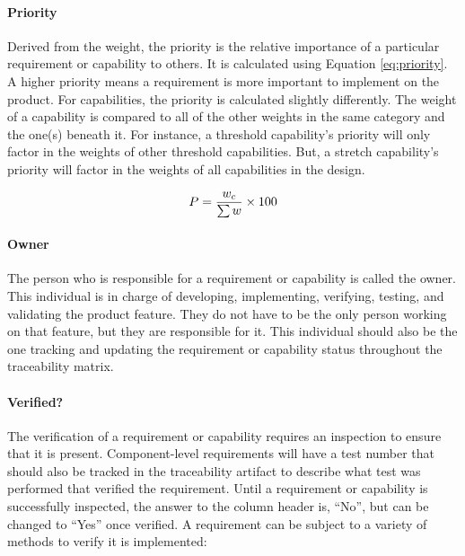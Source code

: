 \paragraph*{Priority} Derived from the weight, the priority is the relative importance of a particular requirement or capability to others.
It is calculated using Equation \ref{eq:priority}. 
A higher priority means a requirement is more important to implement on the product.
For capabilities, the priority is calculated slightly differently.
The weight of a capability is compared to all of the other weights in the same category and the one(s) beneath it.
For instance, a threshold capability's priority will only factor in the weights of other threshold capabilities.
But, a stretch capability's priority will factor in the weights of all capabilities in the design.

\begin{equation} \labeq{priority}
    P = \frac{w_c}{\sum w} \times 100
\end{equation}

\paragraph*{Owner} The person who is responsible for a requirement or capability is called the owner.
This individual is in charge of developing, implementing, verifying, testing, and validating the product feature.
They do not have to be the only person working on that feature, but they are responsible for it.
This individual should also be the one tracking and updating the requirement or capability status throughout the traceability matrix. 

\paragraph*{Verified?} The verification of a requirement or capability requires an inspection to ensure that it is present.
Component-level requirements will have a test number that should also be tracked in the traceability artifact to describe what test was performed that verified the requirement.
Until a requirement or capability is successfully inspected, the answer to the column header is, ``No'', but can be changed to ``Yes'' once verified.
A requirement can be subject to a variety of methods to verify it is implemented:


